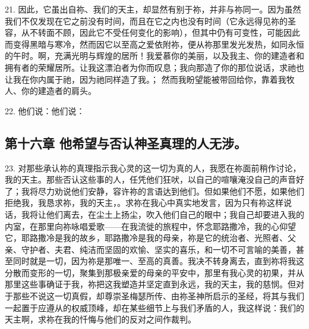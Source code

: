 21. 因此，它虽出自祢、我们的天主，却显然有别于祢，并非与祢同一。因为虽然我们不仅发现在它之前没有时间，而且在它之内也没有时间（它永远得见祢的圣容，从不转面不顾，因此它不受任何变化的影响），但其中仍有可变性，可能因此而变得黑暗与寒冷，然而因它以至高之爱依附祢，便从祢那里发光发热，如同永恒的午时。啊，充满光明与辉煌的居所！我爱慕你的美丽，以及我主、你的建造者和拥有者的荣耀居所。让我这漂泊者为你而叹息；我向那造了你的那位说话，求祂也让我在你内属于祂，因为祂同样造了我。； 然而我盼望能被带回给你，靠着我牧人、你的建造者的肩头。\par

22. 他们说：他们说：\par


\subsection{第十六章 他希望与否认神圣真理的人无涉。}

23. 对那些承认祢的真理指示我心灵的这一切为真的人，我愿在祢面前稍作讨论，我的天主。那些否认这些事的人，任凭他们狂吠，以自己的喧嚷淹没自己的声音好了；我将尽力劝说他们安静，容许祢的言语达到他们。但如果他们不愿，如果他们拒绝我，我恳求祢，我的天主，。求祢在我心中真实地发言，因为只有祢这样说话，我将让他们离去，在尘土上扬尘，吹入他们自己的眼中；我自己却要进入我的内室，在那里向祢咏唱爱歌——在我流徙的旅程中，怀念耶路撒冷，我的心仰望它，耶路撒冷是我的故乡，耶路撒冷是我的母亲，祢是它的统治者、光照者、父亲、守护者、夫君、纯洁而坚固的欢愉、坚实的喜乐，和一切不可言喻的美善，甚至同时就是一切，因为祢是那唯一、至高的真善。我决不转身离去，直到祢将我这分散而变形的一切，聚集到那极亲爱的母亲的平安中，那里有我心灵的初果，并从那里这些事确证于我，祢把这我塑造并坚定直到永远，我的天主，我的慈悯。但对于那些不说这一切真假，却尊崇圣梅瑟所传、由祢圣神所启示的圣经，将其与我们一起置于应遵从的权威顶峰，却在某些细节上与我们矛盾的人，我这样说：我们的天主啊，求祢在我的忏悔与他们的反对之间作裁判。\par

